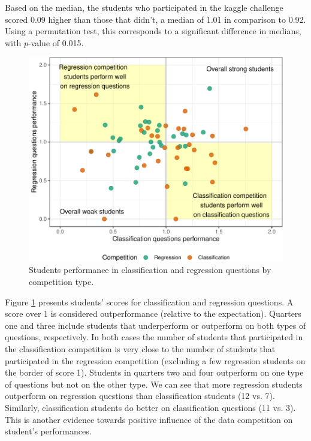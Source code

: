 \documentclass[12pt]{article}
\begin{document}
Based on the median, the students who participated in the kaggle
challenge scored 0.09 higher than those that didn't, a median of 1.01 in
comparison to 0.92. Using a permutation test, this corresponds to a
significant difference in medians, with \(p\)-value of 0.015.

\begin{figure}
\centering
\includegraphics{paper-kaggle_files/figure-latex/crossperformances-1.pdf}
\caption{\label{fig:crossperformances} Students performance in
classification and regression questions by competition type.}
\end{figure}

Figure \ref{fig:crossperformances} presents students' scores for
classification and regression questions. A score over 1 is considered
outperformance (relative to the expectation). Quarters one and three
include students that underperform or outperform on both types of
questions, respectively. In both cases the number of students that
participated in the classification competition is very close to the
number of students that participated in the regression competition
(excluding a few regression students on the border of score 1). Students
in quarters two and four outperform on one type of questions but not on
the other type. We can see that more regression students outperform on
regression questions than classification students (12 vs. 7). Similarly,
classification students do better on classification questions (11 vs.
3). This is another evidence towards positive influence of the data
competition on student's performances.
\end{document}
